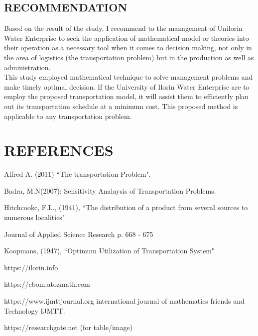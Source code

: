 \documentclass[12pt]{report}
\newcommand{\sps}{\\[0.2cm]}
\begin{document}
	\section{RECOMMENDATION}
	Based on the result of the study, I recommend to the management of Unilorin Water Enterprise to seek the application of mathematical model or theories into their operation as a necessary tool when it comes to decision making, not only in the area of logistics (the transportation problem) but in the production as well as administration.\sps
	This study employed mathematical technique to solve management problems and make timely optimal decision. If the University of Ilorin Water Enterprise are to employ the proposed transportation model, it will assist them to efficiently plan out its transportation schedule at a minimum cost. This proposed method is applicable to any transportation problem.
	
	\chapter*{REFERENCES}
	
	\begin{description}
		\item Alfred A. (2011) ``The transportation Problem".
		\item Badra, M.N(2007): Sensitivity Analaysis of Transportation Problems.
		\item Hitchcookc, F.L., (1941), ``The distribution of a product from several sources to numerous localities"
		\item Journal of Applied Science Research p. 668 - 675
		\item Koopmans, (1947), ``Optimum Utilization of Transportation System"
		\item https://ilorin.info
		\item https://cbom.atozmath.com
		\item https://www.ijmttjournal.org international journal of mathematics friends and Technology IJMTT.
		\item https://researchgate.net (for table/image)
	\end{description}
	
	
	
	
	
	
	
	
	
	
	
	
	
	
	
	
	
	
	
	
	
	
	
	
	
	
	
	
	
	
	
	
	
	
	
	
	
	
	
	
	
	
	
	
\end{document}
